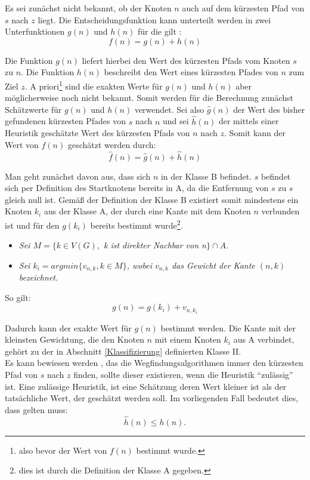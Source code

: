 		Es sei zunächst nicht bekannt, ob der Knoten $n$ auch auf dem kürzesten Pfad von $s$ nach $z$ liegt.
		Die Entscheidungsfunktion kann unterteilt werden in zwei Unterfunktionen $g(n)$ und $h(n)$ für die gilt \cite{Hart1968}:
		\begin{equation}
		f(n)=g(n)+h(n)
		\end{equation}
		
		Die Funktion $g(n)$ liefert hierbei den Wert des kürzesten Pfads vom Knoten $s$ zu $n$. Die Funktion $h(n)$ beschreibt den Wert eines kürzesten Pfades von $n$ zum Ziel $z$. A priori\footnote{also bevor der Wert von $f(n)$ bestimmt wurde.} sind die exakten Werte für $g(n)$ und $h(n)$ aber möglicherweise noch nicht bekannt. Somit werden für die Berechnung zunächst Schätzwerte für $g(n)$ und $h(n)$ verwendet. Sei also $\hat{g}(n)$ der Wert des bisher gefundenen kürzesten Pfades von $s$ nach $n$ und sei $\hat{h}(n)$ der mittels einer Heuristik geschätzte Wert des kürzesten Pfads von $n$ nach $z$. Somit kann der Wert von $f(n)$ geschätzt werden durch:
		\begin{equation}
			\hat{f}(n)=\hat{g}(n)+\hat{h}(n)
		\end{equation}
	
		Man geht zunächst davon aus, dass sich $n$ in der Klasse B befindet. $s$ befindet sich per Definition des Startknotens bereits in A, da die Entfernung von $s$ zu $s$ gleich null ist. Gemäß der Definition der Klasse B existiert somit mindestens ein Knoten $k_i$ aus der Klasse A, der durch eine Kante mit dem Knoten $n$ verbunden ist und für den $g(k_i)$ bereits bestimmt wurde\footnote{dies ist durch die Definition der Klasse A gegeben.}.
		\begin{itemize}
			\item \textit{Sei $M=\{k\in V(G),$ k ist direkter Nachbar von n$\} \cap A$.}
			\item \textit{Sei $k_i=arg min\{v_{n,k},k\in M\}$, wobei $v_{n,k}$ das Gewicht der Kante $(n,k)$ bezeichnet.}
		\end{itemize}
		 So gilt:
		\begin{equation}
			g(n)=g(k_i)+v_{n,k_i}
		\end{equation}
		
		Dadurch kann der exakte Wert für $g(n)$ bestimmt werden. Die Kante mit der kleinsten Gewichtung, die den Knoten $n$ mit einem Knoten $k_i$ aus A verbindet, gehört zu der in Abschnitt \ref{Klassifizierung} definierten Klasse II.\\
		Es kann bewiesen werden \cite{Hart1968}, das die Wegfindungsalgorithmen immer den kürzesten Pfad von $s$ nach $z$ finden, sollte dieser existieren, wenn die Heuristik "`zulässig"' ist. Eine zulässige Heuristik, ist eine Schätzung deren Wert kleiner ist als der tatsächliche Wert, der geschätzt werden soll. Im vorliegenden Fall bedeutet dies, dass gelten muss:
		\begin{equation}
			\hat{h}(n)\le h(n).
		\end{equation}
		
